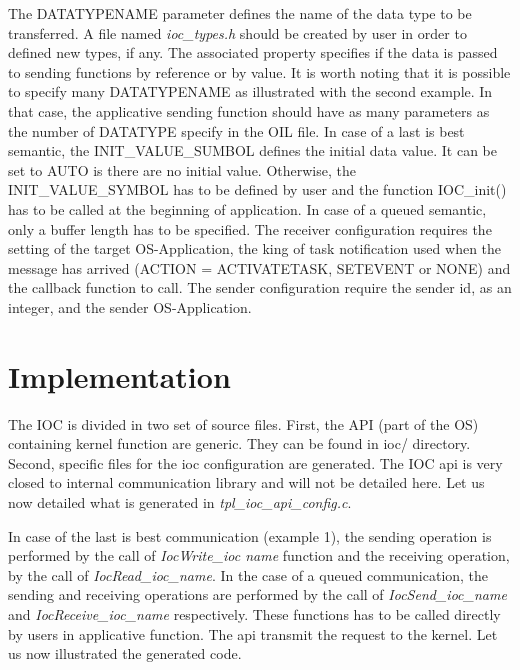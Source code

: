 The DATATYPENAME parameter defines the name of the data type to be transferred. A file named \textit{ioc_types.h} should be created by user in order to defined new types, if any. The associated property specifies if the data is passed to sending functions by reference or by value. It is worth noting that it is possible to specify many DATATYPENAME as illustrated with the second example. In that case, the applicative sending function should have as many parameters as the number of DATATYPE specify in the OIL file. 
In case of a last is best semantic, the INIT_VALUE_SUMBOL defines the initial data value. It can be set to AUTO is there are no initial value. Otherwise, the INIT_VALUE_SYMBOL has to be defined by user and the function IOC_init() has to be called at the beginning of application. In case of a queued semantic, only a buffer length has to be specified.
The receiver configuration requires the setting of the target OS-Application, the king of task notification used when the message has arrived (ACTION = ACTIVATETASK, SETEVENT or NONE) and the callback function to call.
The sender configuration require the sender id, as an integer, and the sender OS-Application. 

\section{Implementation}

The IOC is divided in two set of source files. First, the API (part of the OS) containing kernel function are generic. They can be found in ioc/ directory. Second, specific files for the ioc configuration are generated. The IOC api is very closed to internal communication library and will not be detailed here. Let us now detailed what is generated in \textit{tpl_ioc_api_config.c}.

In case of the last is best communication (example 1), the sending operation is performed by the call of \textit{IocWrite_ioc name} function and the receiving operation, by the call of \textit{IocRead_ioc_name}. In the case of a queued communication, the sending and receiving operations are performed by the call of \textit{IocSend_ioc_name} and \textit{IocReceive_ioc_name} respectively. These functions has to be called directly by users in applicative function. The api transmit the request to the kernel. Let us now illustrated the generated code.

